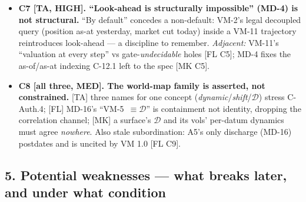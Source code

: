 \documentclass[11pt,a4paper]{article}
\begin{document}
\begin{itemize}
  model-mark's bit-for-bit claim (VM-8, VM-11) rests on it. C-Auth.3 requires amending the
  Constitution first.
  \item \textbf{C7 [TA, HIGH]. ``Look-ahead is structurally impossible'' (MD-4) is not
  structural.} ``By default'' concedes a non-default: VM-2's legal decoupled query (position
  as-at yesterday, market cut today) inside a VM-11 trajectory reintroduces look-ahead ---
  a discipline to remember. \emph{Adjacent:} VM-11's ``valuation at every step'' vs
  gate-\emph{undecidable} holes [FL C5]; MD-4 fixes the as-of/as-at indexing C-12.1 left to the
  spec [MK C5].
  \item \textbf{C8 [all three, MED]. The world-map family is asserted, not constrained.} [TA]
  three names for one concept (\emph{dynamic}/\emph{shift}/$\mathcal{D}$) stress C-Auth.4; [FL]
  MD-16's ``VM-5~$\equiv\mathcal{D}$'' is containment not identity, dropping the correlation
  channel; [MK] a surface's $\mathcal{D}$ and its vols' per-datum dynamics must agree
  \emph{nowhere}. Also stale subordination: A5's only discharge (MD-16) postdates and is uncited
  by VM 1.0 [FL C9].
\end{itemize}

\subsection*{5. Potential weaknesses --- what breaks later, and under what condition}
\end{document}
